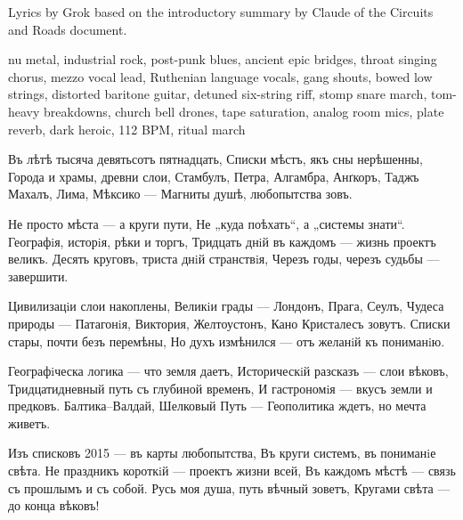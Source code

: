 
\begin{notes}
Lyrics by Grok based on the introductory summary by Claude of the Circuits and Roads document.
\end{notes}
\begin{style}
nu metal, industrial rock, post-punk blues, ancient epic bridges, throat singing chorus, mezzo vocal lead, Ruthenian language vocals, gang shouts, bowed low strings, distorted baritone guitar, detuned six-string riff, stomp snare march, tom-heavy breakdowns, church bell drones, tape saturation, analog room mics, plate reverb, dark heroic, 112 BPM, ritual march
\end{style}
\begin{lyrics}
Въ лѣтѣ тысяча девятьсотъ пятнадцать,
Списки мѣстъ, якъ сны нерѣшенны,
Города и храмы, древни слои,
Стамбулъ, Петра, Алгамбра, Анґкоръ,
Таджъ Махалъ, Лима, Мѣксико —
Магниты душѣ, любопытства зовъ.

Не просто мѣста — а круги пути,
Не „куда поѣхать“, а „системы знати“.
Географiя, исторiя, рѣки и торгъ,
Тридцать днiй въ каждомъ — жизнь проектъ великъ.
Десять круговъ, триста днiй странствiя,
Черезъ годы, черезъ судьбы — завершити.

Цивилизацiи слои накоплены,
Великiи грады — Лондонъ, Прага, Сеулъ,
Чудеса природы — Патагонiя, Виктория,
Желтоустонъ, Кано Кристалесъ зовутъ.
Списки стары, почти безъ перемѣны,
Но духъ измѣнился — отъ желанiй къ пониманiю.

Географiческа логика — что земля даетъ,
Историческiй разсказъ — слои вѣковъ,
Тридцатидневный путь съ глубиной временъ,
И гастрономiя — вкусъ земли и предковъ.
Балтика–Валдай, Шелковый Путь —
Геополитика ждетъ, но мечта живетъ.

Изъ списковъ 2015 — въ карты любопытства,
Въ круги системъ, въ пониманiе свѣта.
Не праздникъ короткiй — проектъ жизни всей,
Въ каждомъ мѣстѣ — связь съ прошлымъ и съ собой.
Русь моя душа, путь вѣчный зоветъ,
Кругами свѣта — до конца вѣковъ!
\end{lyrics}

